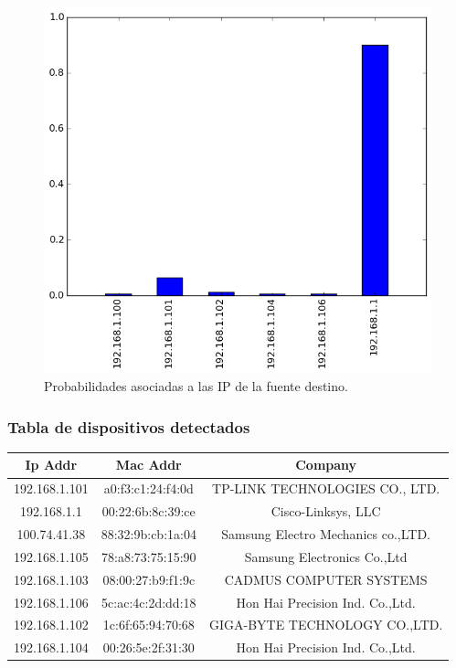 \begin{figure}[h!]
  \centering
	\includegraphics[scale=0.66]{../experimentacion-svilerino/casa/histogram_dst_probabilities.png}
  \caption{Probabilidades asociadas a las IP de la fuente destino.}
	\label{fig:probabilidad-dst-casa}
\end{figure}

\subsubsection{Tabla de dispositivos detectados}
\label{table:disp-table-casa}
\begin{tabular}{ |c|c|c| }
	\hline
	Ip Addr & Mac Addr & Company \\	
	\hline
	192.168.1.101 & a0:f3:c1:24:f4:0d & TP-LINK TECHNOLOGIES CO., LTD. \\
	\hline
	192.168.1.1 & 00:22:6b:8c:39:ce & Cisco-Linksys, LLC \\
	\hline
	100.74.41.38 & 88:32:9b:cb:1a:04 & Samsung Electro Mechanics co.,LTD. \\
	\hline
	192.168.1.105 & 78:a8:73:75:15:90 & Samsung Electronics Co.,Ltd \\
	\hline
	192.168.1.103 & 08:00:27:b9:f1:9c & CADMUS COMPUTER SYSTEMS \\
	\hline
	192.168.1.106 & 5c:ac:4c:2d:dd:18 & Hon Hai Precision Ind. Co.,Ltd. \\
	\hline
	192.168.1.102 & 1c:6f:65:94:70:68 & GIGA-BYTE TECHNOLOGY CO.,LTD. \\
	\hline
	192.168.1.104 & 00:26:5e:2f:31:30 & Hon Hai Precision Ind. Co.,Ltd. \\
	\hline
\end{tabular}

